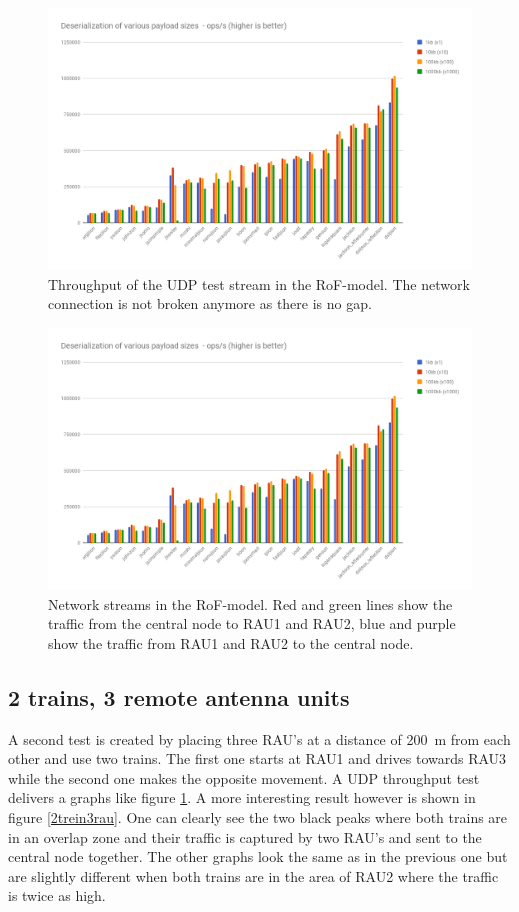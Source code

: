 \documentclass[twocolumn]{phdsymp} %
\begin{document}
\begin{figure}[ht]
\begin{center}
	\includegraphics[width=.40\textwidth]{images/jsondeserialization.png}
	\caption{\label{resultaten-1t2bs}Throughput of the UDP test stream in the RoF-model.  The network connection is not broken anymore as there is no gap.}
\end{center}
\end{figure}


\begin{figure}[ht]
\begin{center}
	\includegraphics[width=.40\textwidth]{images/jsondeserialization.png}
	\caption{\label{RoF-1t2rau-centrale.png}Network streams in the RoF-model.  Red and green lines show the traffic from the central node to RAU1 and RAU2, blue and purple show the traffic from RAU1 and RAU2 to the central node.}
\end{center}
\end{figure}


\subsection{2 trains, 3 remote antenna units}
A second test is created by placing three RAU's at a distance of 200~m from each other and use two trains.  The first one starts at RAU1 and drives towards RAU3 while the second one makes the opposite movement.  A UDP throughput test delivers a graphs like figure \ref{resultaten-1t2bs}.  A more interesting result however is shown in figure \ref{2trein3rau}.  One can clearly see the two black peaks where both trains are in an overlap zone and their traffic is captured by two RAU's and sent to the central node together.  The other graphs look the same as in the previous one but are slightly different when both trains are in the area of RAU2 where the traffic is twice as high.
\end{document}
